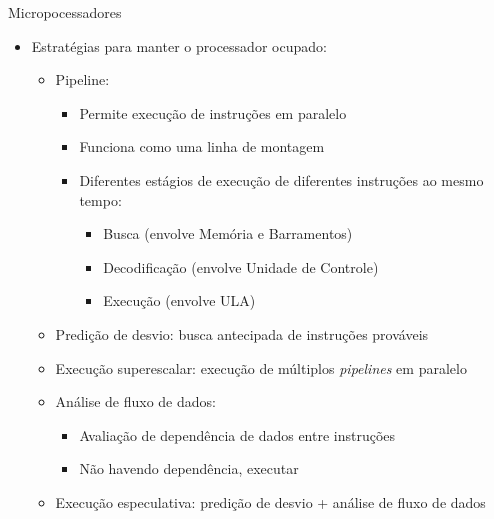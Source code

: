 \begin{slide}[toc=]{Micropocessadores}
	\begin{itemize}
		\item Estratégias para manter o processador ocupado:\pause
			\begin{itemize}
				\item Pipeline: 
					\begin{itemize}
      						\item Permite execução de instruções em paralelo
						\item Funciona como uma linha de montagem
						\item Diferentes estágios de execução de diferentes instruções ao mesmo tempo:\pause
							\begin{itemize}
								\item Busca (envolve Memória e Barramentos)
								\item Decodificação (envolve Unidade de Controle)
								\item Execução (envolve ULA)\pause
							\end{itemize}
					\end{itemize}
				\item Predição de desvio: busca antecipada de instruções prováveis \pause
				\item Execução superescalar: execução de múltiplos \textit{pipelines} em paralelo\pause
				\item Análise de fluxo de dados: 
					\begin{itemize}
						\item Avaliação de dependência de dados entre instruções
						\item Não havendo dependência, executar\pause
					\end{itemize}
				\item Execução especulativa: predição de desvio + análise de fluxo de dados
			\end{itemize}
	\end{itemize}
\end{slide}


